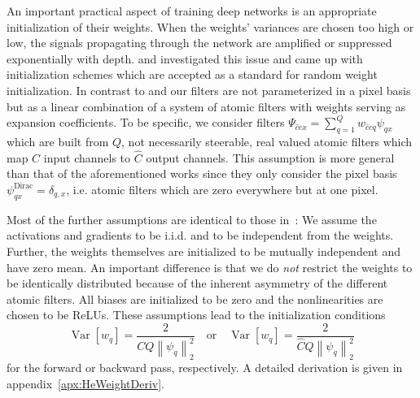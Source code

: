 \documentclass[10pt,twocolumn,letterpaper]{article}
\newcommand{\Var}{\operatorname{Var}}
\newcommand{\norm}[1]{\left\lVert #1 \right\rVert}
\begin{document}
An important practical aspect of training deep networks is an appropriate initialization of their weights.
When the weights' variances are chosen too high or low, the signals propagating through the network are amplified or suppressed exponentially with depth.
\citet{Glorot10understandingthe} and \citet{DBLP:journals/corr/HeZR015} investigated this issue and came up with initialization schemes which are accepted as a standard for random weight initialization.
In contrast to \cite{Glorot10understandingthe} and \cite{DBLP:journals/corr/HeZR015} our filters are not parameterized in a pixel basis but as a linear combination of a system of atomic filters with weights serving as expansion coefficients.
To be specific, we consider filters $\Psi_{\hat{c}cx}=\sum_{q=1}^Q w_{\hat{c}cq} \psi_{qx}$ which are built from $Q$, not necessarily steerable, real valued atomic filters which map $C$ input channels to $\hat{C}$ output channels.
This assumption is more general than that of the aforementioned works since they only consider the pixel basis $\psi_{qx}^\text{Dirac}=\delta_{q,x}$, i.e. atomic filters which are zero everywhere but at one pixel.

Most of the further assumptions are identical to those in~\cite{DBLP:journals/corr/HeZR015}:
We assume the activations and gradients to be i.i.d. and to be independent from the weights.
Further, the weights themselves are initialized to be mutually independent and have zero mean.
An important difference is that we do \emph{not} restrict the weights to be identically distributed because of the inherent asymmetry of the different atomic filters.
All biases are initialized to be zero and the nonlinearities are chosen to be ReLUs.
These assumptions lead to the initialization conditions
\[
	\Var\left[w_q\right]=\frac{2}{CQ\norm{\psi_q}_2^2} \quad \text{or} \quad \Var\left[w_q\right]=\frac{2}{\hat{C}Q\norm{\psi_q}_2^2}
\]
for the forward or backward pass, respectively.
A detailed derivation is given in appendix~\ref{apx:HeWeightDeriv}.
\end{document}
